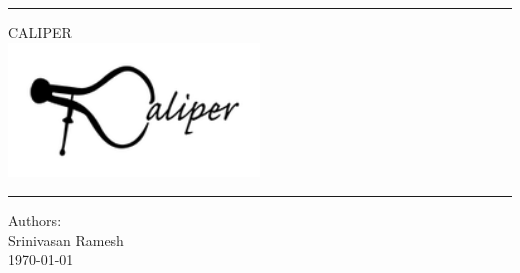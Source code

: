 \begin{titlepage}
\begin{center}

\rule{\linewidth}{0.5mm}

\textsc{\large CALIPER}
~\\[1cm]
\includegraphics[width=0.5\textwidth]{./caliper.png}~\\[1cm]

	{\Huge \linespread{2}}

\vspace{10pt}

\rule{\linewidth}{0.5mm}

\vfill

Authors:\\
Srinivasan Ramesh\\

\vfill
{\large \today}

\end{center}
\end{titlepage}
